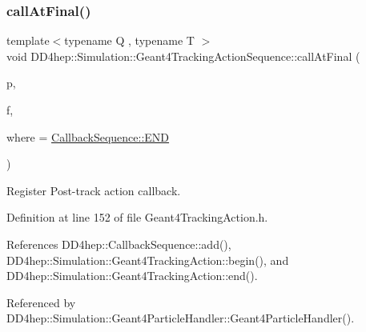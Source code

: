 \subsubsection{\texorpdfstring{call\+At\+Final()}{callAtFinal()}}
{\footnotesize\ttfamily template$<$typename Q , typename T $>$ \\
void D\+D4hep\+::\+Simulation\+::\+Geant4\+Tracking\+Action\+Sequence\+::call\+At\+Final (\begin{DoxyParamCaption}\item[{Q $\ast$}]{p,  }\item[{void(T\+::$\ast$)(const G4\+Track $\ast$)}]{f,  }\item[{\hyperlink{struct_d_d4hep_1_1_callback_sequence_a7753490247479633aed16a2376821ef7}{Callback\+Sequence\+::\+Location}}]{where = {\ttfamily \hyperlink{struct_d_d4hep_1_1_callback_sequence_a7753490247479633aed16a2376821ef7ac39eeb1bcfc1c235ab1d0d9315c310ac}{Callback\+Sequence\+::\+E\+ND}} }\end{DoxyParamCaption})\hspace{0.3cm}{\ttfamily [inline]}}



Register Post-\/track action callback. 



Definition at line 152 of file Geant4\+Tracking\+Action.\+h.



References D\+D4hep\+::\+Callback\+Sequence\+::add(), D\+D4hep\+::\+Simulation\+::\+Geant4\+Tracking\+Action\+::begin(), and D\+D4hep\+::\+Simulation\+::\+Geant4\+Tracking\+Action\+::end().



Referenced by D\+D4hep\+::\+Simulation\+::\+Geant4\+Particle\+Handler\+::\+Geant4\+Particle\+Handler().

\hypertarget{class_d_d4hep_1_1_simulation_1_1_geant4_tracking_action_sequence_aa4b5d6290cb6ba9b017aac6acb6bd264}{}\label{class_d_d4hep_1_1_simulation_1_1_geant4_tracking_action_sequence_aa4b5d6290cb6ba9b017aac6acb6bd264} 
